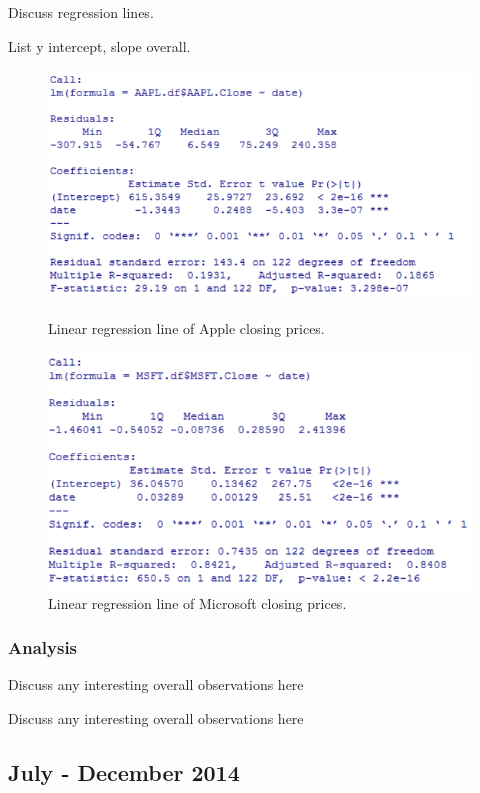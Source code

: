 \documentclass[paper=a4, fontsize=11pt]{scrartcl} %
\numberwithin{equation}{section} %
\numberwithin{figure}{section} %
\numberwithin{table}{section} %
\begin{document}
Discuss regression lines. 

List y intercept, slope overall. 

\begin{figure}[!htb]
  \includegraphics[width=\linewidth]{graph/aapl_reg_7.png}
  \caption{Linear regression line of Apple closing prices.}
\endminipage\hfill
{}
  \includegraphics[width=\linewidth]{graph/msft_reg_7.png}
  \caption{Linear regression line of Microsoft closing prices.}
\endminipage\hfill
\end{figure}


\subsubsection{Analysis}
Discuss any interesting overall observations here

Discuss any interesting overall observations here

\subsection{July - December  2014}
\end{document}

